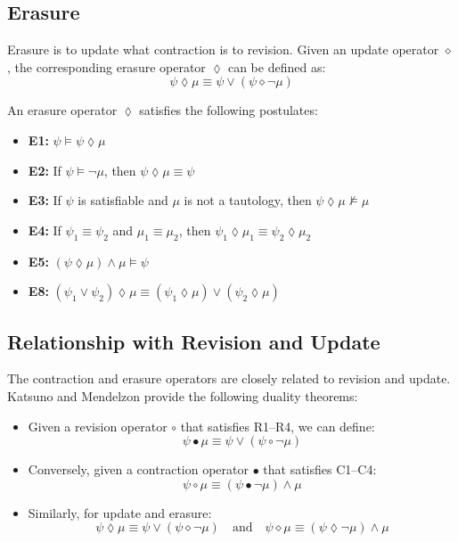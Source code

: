 \documentclass[runningheads]{llncs}
\begin{document}
\subsection{Erasure}

Erasure is to update what contraction is to revision. Given an update operator \( \diamond \), the corresponding erasure operator \( \lozenge \) can be defined as:
\[
\psi \lozenge \mu \equiv \psi \lor (\psi \diamond \neg \mu)
\]

An erasure operator \( \lozenge \) satisfies the following postulates:

\begin{itemize}
    \item \textbf{E1:} \( \psi \models \psi \lozenge \mu \)
    \item \textbf{E2:} If \( \psi \models \neg \mu \), then \( \psi \lozenge \mu \equiv \psi \)
    \item \textbf{E3:} If \( \psi \) is satisfiable and \( \mu \) is not a tautology, then \( \psi \lozenge \mu \not\models \mu \)
    \item \textbf{E4:} If \( \psi_1 \equiv \psi_2 \) and \( \mu_1 \equiv \mu_2 \), then \( \psi_1 \lozenge \mu_1 \equiv \psi_2 \lozenge \mu_2 \)
    \item \textbf{E5:} \( (\psi \lozenge \mu) \land \mu \models \psi \)
    \item \textbf{E8:} \( (\psi_1 \lor \psi_2) \lozenge \mu \equiv (\psi_1 \lozenge \mu) \lor (\psi_2 \lozenge \mu) \)
\end{itemize}

\subsection{Relationship with Revision and Update}

The contraction and erasure operators are closely related to revision and update. Katsuno and Mendelzon provide the following duality theorems:

\begin{itemize}
    \item Given a revision operator \( \circ \) that satisfies R1–R4, we can define:
    \[
    \psi \bullet \mu \equiv \psi \lor (\psi \circ \neg \mu)
    \]
    \item Conversely, given a contraction operator \( \bullet \) that satisfies C1–C4:
    \[
    \psi \circ \mu \equiv (\psi \bullet \neg \mu) \land \mu
    \]
    \item Similarly, for update and erasure:
    \[
    \psi \lozenge \mu \equiv \psi \lor (\psi \diamond \neg \mu)
    \quad \text{and} \quad
    \psi \diamond \mu \equiv (\psi \lozenge \neg \mu) \land \mu
    \]
\end{itemize}
\end{document}

